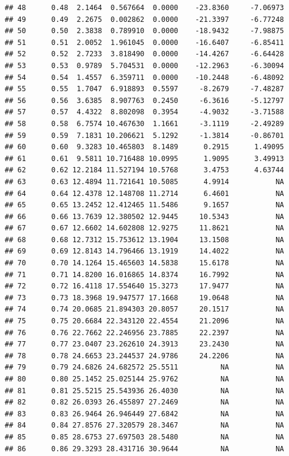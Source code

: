 \documentclass{article}\usepackage[]{graphicx}\usepackage[]{color}
\makeatletter
\newenvironment{kframe}{%
 \def\at@end@of@kframe{}%
 \ifinner\ifhmode%
  \def\at@end@of@kframe{\end{minipage}}%
  \begin{minipage}{\columnwidth}%
 \fi\fi%
 \def\FrameCommand##1{\hskip\@totalleftmargin \hskip-\fboxsep
 \colorbox{shadecolor}{##1}\hskip-\fboxsep
     \hskip-\linewidth \hskip-\@totalleftmargin \hskip\columnwidth}%
 \MakeFramed {\advance\hsize-\width
   \@totalleftmargin\z@ \linewidth\hsize
   \@setminipage}}%
 {\par\unskip\endMakeFramed%
 \at@end@of@kframe}
\newenvironment{knitrout}{}{} %
\makeatother
\begin{document}
\begin{knitrout}
\begin{kframe}
\begin{verbatim}
## 48      0.48  2.1464  0.567664  0.0000    -23.8360     -7.06973
## 49      0.49  2.2675  0.002862  0.0000    -21.3397     -6.77248
## 50      0.50  2.3838  0.789910  0.0000    -18.9432     -7.98875
## 51      0.51  2.0052  1.961045  0.0000    -16.6407     -6.85411
## 52      0.52  2.7233  3.818490  0.0000    -14.4267     -6.64428
## 53      0.53  0.9789  5.704531  0.0000    -12.2963     -6.30094
## 54      0.54  1.4557  6.359711  0.0000    -10.2448     -6.48092
## 55      0.55  1.7047  6.918893  0.5597     -8.2679     -7.48287
## 56      0.56  3.6385  8.907763  0.2450     -6.3616     -5.12797
## 57      0.57  4.4322  8.802098  0.3954     -4.9032     -3.71588
## 58      0.58  6.7574 10.467630  1.1661     -3.1119     -2.49289
## 59      0.59  7.1831 10.206621  5.1292     -1.3814     -0.86701
## 60      0.60  9.3283 10.465803  8.1489      0.2915      1.49095
## 61      0.61  9.5811 10.716488 10.0995      1.9095      3.49913
## 62      0.62 12.2184 11.527194 10.5768      3.4753      4.63744
## 63      0.63 12.4894 11.721641 10.5085      4.9914           NA
## 64      0.64 12.4378 12.148708 11.2714      6.4601           NA
## 65      0.65 13.2452 12.412465 11.5486      9.1657           NA
## 66      0.66 13.7639 12.380502 12.9445     10.5343           NA
## 67      0.67 12.6602 14.602808 12.9275     11.8621           NA
## 68      0.68 12.7312 15.753612 13.1904     13.1508           NA
## 69      0.69 12.8143 14.796466 13.1919     14.4022           NA
## 70      0.70 14.1264 15.465603 14.5838     15.6178           NA
## 71      0.71 14.8200 16.016865 14.8374     16.7992           NA
## 72      0.72 16.4118 17.554640 15.3273     17.9477           NA
## 73      0.73 18.3968 19.947577 17.1668     19.0648           NA
## 74      0.74 20.0685 21.894303 20.8057     20.1517           NA
## 75      0.75 20.6684 22.343120 22.4554     21.2096           NA
## 76      0.76 22.7662 22.246956 23.7885     22.2397           NA
## 77      0.77 23.0407 23.262610 24.3913     23.2430           NA
## 78      0.78 24.6653 23.244537 24.9786     24.2206           NA
## 79      0.79 24.6826 24.682572 25.5511          NA           NA
## 80      0.80 25.1452 25.025144 25.9762          NA           NA
## 81      0.81 25.5215 25.543936 26.4030          NA           NA
## 82      0.82 26.0393 26.455897 27.2469          NA           NA
## 83      0.83 26.9464 26.946449 27.6842          NA           NA
## 84      0.84 27.8576 27.320579 28.3467          NA           NA
## 85      0.85 28.6753 27.697503 28.5480          NA           NA
## 86      0.86 29.3293 28.431716 30.9644          NA           NA

\end{verbatim}
\end{kframe}
\end{knitrout}
\end{document}
